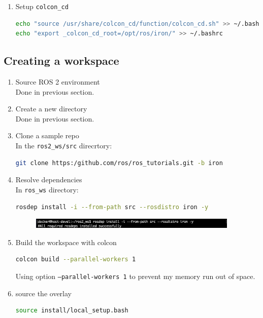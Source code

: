 \documentclass[12pt, a4paper]{article}
\begin{document}
\begin{enumerate}
\item Setup \texttt{colcon\_cd}
\begin{lstlisting}[language=bash]
echo "source /usr/share/colcon_cd/function/colcon_cd.sh" >> ~/.bashrc
echo "export _colcon_cd_root=/opt/ros/iron/" >> ~/.bashrc
\end{lstlisting}
\end{enumerate}

\newpage
\subsection{Creating a workspace}
\begin{enumerate}
	\item Source ROS 2 environment\\
		Done in previous section.
	\item Create a new directory\\
		Done in previous section.
	\item Clone a sample repo\\
		In the \texttt{ros2\_ws/src} direcrtory:
\begin{lstlisting}[language=bash]
git clone https:/github.com/ros/ros_tutorials.git -b iron
\end{lstlisting}
	\item Resolve dependencies\\
		In \texttt{ros\_ws} directory:
\begin{lstlisting}[language=bash]
rosdep install -i --from-path src --rosdistro iron -y
\end{lstlisting}
\begin{figure}[h]
	\setlength{\leftskip}{2.4em}
	\includegraphics[width=0.94\textwidth]{2/p2.2-1}
\end{figure}
\item Build the workspace with colcon
\begin{lstlisting}[language=bash]
colcon build --parallel-workers 1
\end{lstlisting}
Using option \texttt{--parallel-workers 1} to prevent my memory run out of space.
\item source the overlay
\begin{lstlisting}[language=bash]
source install/local_setup.bash
\end{lstlisting}


\end{enumerate}
\end{document}
